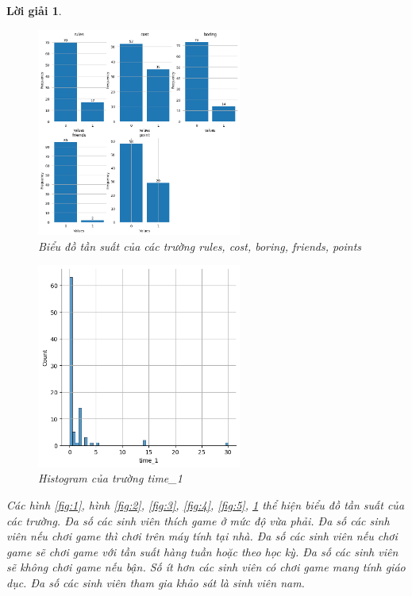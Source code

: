 \documentclass[14pt, a4paper]{article}
\theoremstyle{sltheorem}
\theoremstyle{soltheorem}
\newtheorem*{loigiai}{Lời giải}
\begin{document}
\begin{loigiai}
    \begin{figure}[h!]
        \centering
        \includegraphics[width=0.6\textwidth]{6.png}
        \caption{Biểu đồ tần suất của các trường rules, cost, boring, friends, points}
        \label{fig:6}
    \end{figure}

    \begin{figure}[h!]
        \centering
        \includegraphics[width=0.6\textwidth]{7.png}
        \caption{Histogram của trường time\_1}
        \label{fig:7}
    \end{figure}

    Các hình \ref{fig:1}, hình \ref{fig:2}, \ref{fig:3}, \ref{fig:4}, \ref{fig:5}, \ref{fig:6} thể hiện biểu đồ tần suất của các trường.
    Đa số các sinh viên thích game ở mức độ vừa phải.
    Đa số các sinh viên nếu chơi game thì chơi trên máy tính tại nhà.
    Đa số các sinh viên nếu chơi game sẽ chơi game với tần suất hàng tuần hoặc theo học kỳ.
    Đa số các sinh viên sẽ không chơi game nếu bận.
    Số ít hơn các sinh viên có chơi game mang tính giáo dục.
    Đa số các sinh viên tham gia khảo sát là sinh viên nam.


\end{loigiai}
\end{document}
